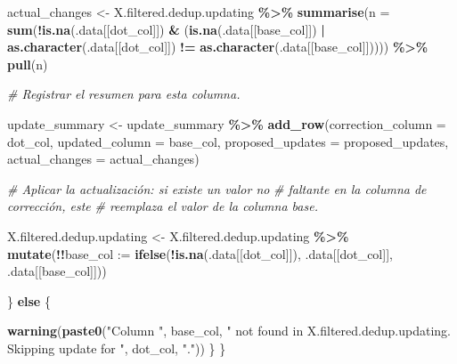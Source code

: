 \documentclass[sn-apa,pdflatex]{sn-jnl}
\newenvironment{Shaded}{\begin{snugshade}}{\end{snugshade}}
\newcommand{\AttributeTok}[1]{\textcolor[rgb]{0.13,0.29,0.53}{#1}}
\newcommand{\CommentTok}[1]{\textcolor[rgb]{0.56,0.35,0.01}{\textit{#1}}}
\newcommand{\ControlFlowTok}[1]{\textcolor[rgb]{0.13,0.29,0.53}{\textbf{#1}}}
\newcommand{\FunctionTok}[1]{\textcolor[rgb]{0.13,0.29,0.53}{\textbf{#1}}}
\newcommand{\NormalTok}[1]{#1}
\newcommand{\OtherTok}[1]{\textcolor[rgb]{0.56,0.35,0.01}{#1}}
\newcommand{\SpecialCharTok}[1]{\textcolor[rgb]{0.81,0.36,0.00}{\textbf{#1}}}
\newcommand{\StringTok}[1]{\textcolor[rgb]{0.31,0.60,0.02}{#1}}
\begin{document}
\begin{Shaded}
\begin{Highlighting}[]
\NormalTok{        actual\_changes }\OtherTok{\textless{}{-}}\NormalTok{ X.filtered.dedup.updating }\SpecialCharTok{\%\textgreater{}\%}
            \FunctionTok{summarise}\NormalTok{(}\AttributeTok{n =} \FunctionTok{sum}\NormalTok{(}\SpecialCharTok{!}\FunctionTok{is.na}\NormalTok{(.data[[dot\_col]]) }\SpecialCharTok{\&}\NormalTok{ (}\FunctionTok{is.na}\NormalTok{(.data[[base\_col]]) }\SpecialCharTok{|}
                \FunctionTok{as.character}\NormalTok{(.data[[dot\_col]]) }\SpecialCharTok{!=} \FunctionTok{as.character}\NormalTok{(.data[[base\_col]])))) }\SpecialCharTok{\%\textgreater{}\%}
            \FunctionTok{pull}\NormalTok{(n)}

        \CommentTok{\# Registrar el resumen para esta columna.}

\NormalTok{        update\_summary }\OtherTok{\textless{}{-}}\NormalTok{ update\_summary }\SpecialCharTok{\%\textgreater{}\%}
            \FunctionTok{add\_row}\NormalTok{(}\AttributeTok{correction\_column =}\NormalTok{ dot\_col, }\AttributeTok{updated\_column =}\NormalTok{ base\_col,}
                \AttributeTok{proposed\_updates =}\NormalTok{ proposed\_updates, }\AttributeTok{actual\_changes =}\NormalTok{ actual\_changes)}

        \CommentTok{\# Aplicar la actualización: si existe un valor no}
        \CommentTok{\# faltante en la columna de corrección, este}
        \CommentTok{\# reemplaza el valor de la columna base.}

\NormalTok{        X.filtered.dedup.updating }\OtherTok{\textless{}{-}}\NormalTok{ X.filtered.dedup.updating }\SpecialCharTok{\%\textgreater{}\%}
            \FunctionTok{mutate}\NormalTok{(}\SpecialCharTok{!!}\AttributeTok{base\_col :=} \FunctionTok{ifelse}\NormalTok{(}\SpecialCharTok{!}\FunctionTok{is.na}\NormalTok{(.data[[dot\_col]]),}
\NormalTok{                .data[[dot\_col]], .data[[base\_col]]))}

\NormalTok{    \} }\ControlFlowTok{else}\NormalTok{ \{}

        \FunctionTok{warning}\NormalTok{(}\FunctionTok{paste0}\NormalTok{(}\StringTok{"Column \textquotesingle{}"}\NormalTok{, base\_col, }\StringTok{"\textquotesingle{} not found in X.filtered.dedup.updating. Skipping update for \textquotesingle{}"}\NormalTok{,}
\NormalTok{            dot\_col, }\StringTok{"\textquotesingle{}."}\NormalTok{))}
\NormalTok{    \}}
\NormalTok{\}}


\end{Highlighting}
\end{Shaded}
\end{document}
